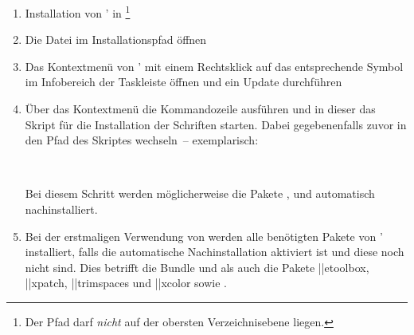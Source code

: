 %
\begin{enumerate}
\item Installation von \MiKTeX' in 
  \footnote{%
    Der Pfad darf \emph{nicht} auf der obersten Verzeichnisebene 
     liegen.
  }%
\item Die Datei  im Installationspfad öffnen
\item Das Kontextmenü von \MiKTeX' mit einem Rechtsklick auf das entsprechende 
  Symbol im Infobereich der Taskleiste öffnen und ein Update durchführen
\item Über das Kontextmenü die Kommandozeile ausführen und in dieser das Skript 
  für die Installation der Schriften  starten.
  Dabei gegebenenfalls zuvor in den Pfad des Skriptes wechseln~-- exemplarisch:
  \begin{quoting}[leftmargin=1.5em,rightmargin=0pt]
  \newline
  \,
  \end{quoting}
  Bei diesem Schritt werden möglicherweise die Pakete , 
   und  automatisch nachinstalliert.
\item Bei der erstmaligen Verwendung von \TUDScript werden alle benötigten 
  Pakete von \MiKTeX' installiert, falls die automatische Nachinstallation 
  aktiviert ist und diese noch nicht sind. Dies betrifft die Bundle 
   und  als auch die Pakete 
  \Package||{etoolbox}, \Package||{xpatch}, \Package||{trimspaces} und
  \Package||{xcolor} sowie .
\end{enumerate}
%
